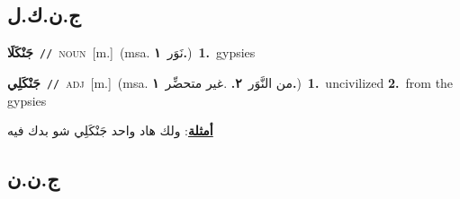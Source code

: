 \documentclass[10pt,a4paper,twoside]{article} %
\begin{document}
\begin{multicols}{2}
\vspace{-3mm}
\subsection*{\color{blue}\foreignlanguage{arabic}{ج.ن.ك.ل}\color{blue}{}} 

{\setlength\topsep{0pt}\textbf{\foreignlanguage{arabic}{جَنْكَلَا}}\ {\color{gray}\texttt{//}\color{black}}\ \textsc{noun}\ [m.]\ \color{gray}(msa. \foreignlanguage{arabic}{نَوَر}~\foreignlanguage{arabic}{\textbf{١.}})\color{black}\ \textbf{1.}~gypsies\ } \vspace{2mm}

{\setlength\topsep{0pt}\textbf{\foreignlanguage{arabic}{جَنْكَلِي}}\ {\color{gray}\texttt{//}\color{black}}\ \textsc{adj}\ [m.]\ \color{gray}(msa. \foreignlanguage{arabic}{من النَّوَر}~\foreignlanguage{arabic}{\textbf{٢.}}  .\foreignlanguage{arabic}{غير متحضِّر}~\foreignlanguage{arabic}{\textbf{١.}})\color{black}\ \textbf{1.}~uncivilized  \textbf{2.}~from the gypsies\  \begin{flushright}\color{gray}\foreignlanguage{arabic}{\textbf{\underline{\foreignlanguage{arabic}{أمثلة}}}: ولك هاد واحد جَنْكَلِي شو بدك فيه}\end{flushright}\color{black}} \vspace{2mm}

\vspace{-3mm}
\subsection*{\color{blue}\foreignlanguage{arabic}{ج.ن.ن}\color{blue}{}} 


\end{multicols}
\end{document}
